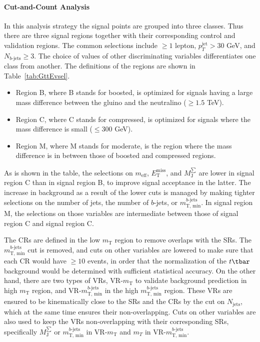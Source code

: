 \paragraph{Cut-and-Count Analysis} In this analysis strategy the signal points
are grouped into three classes. Thus there are three signal regions together
with their corresponding control and validation regions. The common selections
include $\geq 1$ lepton, $p_T^{\text{jet}} > 30$ GeV, and $N_{b\text{-jets}}
	\geq 3$. The choice of values of other discriminating variables differentiates
	one class from another. The definitions of the regions are shown in
Table~\ref{tab:GttEvsel}.

\begin{itemize}

	\item Region B, where B stands for boosted, is optimized for signals having a
	      large mass difference between the gluino and the neutralino ($\geq 1.5$ TeV).

	\item Region C, where C stands for compressed, is optimized for signals where
	      the mass difference is small ($\leq 300$ GeV).

	\item Region M, where M stands for moderate, is the region where the mass
	      difference is in between those of boosted and compressed regions.

\end{itemize}

As is shown in the table, the selections on $m_{\text{eff}}$,
$E_{\text{T}}^{\text{miss}}$, and $M_{\text{J}}^{\sum}$ are lower in signal
region C than in signal region B, to improve signal acceptance in the latter.
The increase in background as a result of the lower cuts is managed by making
tighter selections on the number of jets, the number of $b$-jets, or
$m_{\text{T, min}}^{b\text{-jets}}$. In signal region M, the selections on
those variables are intermediate between those of signal region C and signal
region C.

The CRs are defined in the low $m_{\text{T}}$ region to remove overlaps with
the SRs. The $m_{\text{T, min}}^{b\text{-jets}}$ cut is removed, and cuts on
other variables are lowered to make sure that each CR would have $\geq 10$
events, in order that the normalization of the $t\tbar$ background would be
determined with sufficient statistical accuracy. On the other hand, there are
two types of VRs, VR-$m_{\text{T}}$ to validate background prediction in high
$m_{\text{T}}$ region, and VR-$m_{\text{T, min}}^{b\text{-jets}}$ in the high
$m_{\text{T, min}}^{b\text{-jets}}$ region. These VRs are ensured to be
kinematically close to the SRs and the CRs by the cut on $N_{\text{jets}}$,
which at the same time ensures their non-overlapping. Cuts on other variables
are also used to keep the VRs non-overlapping with their corresponding SRs,
specifically $M_{\text{J}}^{\sum}$ or $m_{\text{T, min}}^{b\text{-jets}}$ in
VR-$m_{\text{T}}$ and $m_T$ in VR-$m_{\text{T, min}}^{b\text{-jets}}$.


